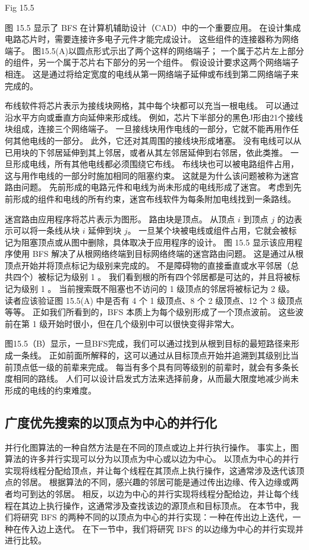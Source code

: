 {\color{red} Fig 15.5}

图 15.5 显示了 BFS 在计算机辅助设计（CAD）中的一个重要应用。 在设计集成电路芯片时，需要连接许多电子元件才能完成设计。 
这些组件的连接器称为网络端子。 图15.5(A)以圆点形式示出了两个这样的网络端子； 
一个属于芯片左上部分的组件，另一个属于芯片右下部分的另一个组件。 假设设计要求这两个网络端子相连。 
这是通过将给定宽度的电线从第一网络端子延伸或布线到第二网络端子来完成的。

布线软件将芯片表示为接线块网格，其中每个块都可以充当一根电线。 可以通过沿水平方向或垂直方向延伸来形成线。 
例如，芯片下半部分的黑色J形由21个接线块组成，连接三个网络端子。 
一旦接线块用作电线的一部分，它就不能再用作任何其他电线的一部分。 此外，它还对其周围的接线块形成堵塞。 
没有电线可以从已用块的下邻居延伸到其上邻居，或者从其左邻居延伸到右邻居，依此类推。 
一旦形成电线，所有其他电线都必须围绕它布线。 布线块也可以被电路组件占用，这与用作电线的一部分时施加相同的阻塞约束。 
这就是为什么该问题被称为迷宫路由问题。 先前形成的电路元件和电线为尚未形成的电线形成了迷宫。 
考虑到先前形成的组件和电线的所有约束，迷宫布线软件为每条附加电线找到一条路线。

迷宫路由应用程序将芯片表示为图形。 路由块是顶点。 从顶点 $i$ 到顶点 $j$ 的边表示可以将一条线从块 $i$ 延伸到块 $j$。 
一旦某个块被电线或组件占用，它就会被标记为阻塞顶点或从图中删除，具体取决于应用程序的设计。 
图 15.5 显示该应用程序使用 BFS 解决了从根网络终端到目标网络终端的迷宫路由问题。 
这是通过从根顶点开始并将顶点标记为级别来完成的。 不是障碍物的直接垂直或水平邻居（总共四个）被标记为级别 1 。 
我们看到根的所有四个邻居都是可达的，并且将被标记为级别 1 。 当前搜索既不阻塞也不访问的 1 级顶点的邻居将被标记为 2 级。 
读者应该验证图 15.5(A) 中是否有 4 个 1 级顶点、8 个 2 级顶点、12 个 3 级顶点等等。 
正如我们所看到的，BFS 本质上为每个级别形成了一个顶点波前。 这些波前在第 1 级开始时很小，但在几个级别中可以很快变得非常大。

图15.5（B）显示，一旦BFS完成，我们可以通过找到从根到目标的最短路径来形成一条线。 
正如前面所解释的，这可以通过从目标顶点开始并追溯到其级别比当前顶点低一级的前辈来完成。 
每当有多个具有同等级别的前辈时，就会有多条长度相同的路线。 
人们可以设计启发式方法来选择前身，从而最大限度地减少尚未形成的电线的约束难度。

\subsection{广度优先搜索的以顶点为中心的并行化}
并行化图算法的一种自然方法是在不同的顶点或边上并行执行操作。 事实上，图算法的许多并行实现可以分为以顶点为中心或以边为中心。 
以顶点为中心的并行实现将线程分配给顶点，并让每个线程在其顶点上执行操作，这通常涉及迭代该顶点的邻居。 
根据算法的不同，感兴趣的邻居可能是通过传出边缘、传入边缘或两者均可到达的邻居。 
相反，以边为中心的并行实现将线程分配给边，并让每个线程在其边上执行操作，这通常涉及查找该边的源顶点和目标顶点。 
在本节中，我们将研究 BFS 的两种不同的以顶点为中心的并行实现：一种在传出边上迭代，一种在传入边上迭代。 
在下一节中，我们将研究 BFS 的以边缘为中心的并行实现并进行比较。

